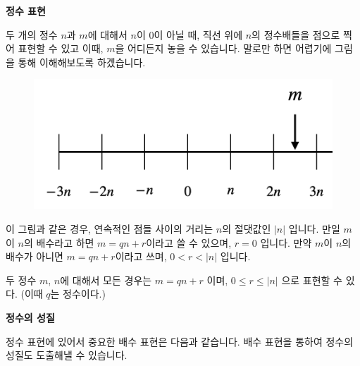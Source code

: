 \bigskip
\begin{flushleft}
    {\textcolor{subheader}{{\LARGE\textbf{정수 표현}}}}
\end{flushleft}

\begin{flushleft}
    두 개의 정수 $n$과 $m$에 대해서 $n$이 $0$이 아닐 때, 직선 위에 $n$의 정수배들을 점으로 찍어 표현할 수 있고 이때, $m$을 어디든지 놓을 수 있습니다. 말로만 하면 어렵기에 그림을 통해 이해해보도록 하겠습니다.
\end{flushleft}
\begin{figure} [h]
\centering
\includegraphics[width=0.7 \textwidth]{Int.png}
\end{figure}
\begin{flushleft}
    이 그림과 같은 경우, 연속적인 점들 사이의 거리는 $n$의 절댓값인 $\lvert n \rvert$ 입니다. 만일 $m$이 $n$의 배수라고 하면 $m = qn + r$이라고 쓸 수 있으며, $r = 0$ 입니다. 만약 $m$이 $n$의 배수가 아니면 $m = qn + r$이라고 쓰며, $0 < r< \lvert n \rvert$ 입니다. 
\end{flushleft}

\begin{tcolorbox}[colback = white, colframe = Definition, title = \textmd{정의: 정수 표현 방법}]
    두 정수 $m$, $n$에 대해서 모든 경우는 $m = qn + r$ 이며, $0 \leq r \leq \lvert n \rvert$ 으로 표현할 수 있다. (이때 $q$는 정수이다.)
\end{tcolorbox}

\bigskip
\begin{flushleft}
    {\textcolor{subheader}{{\LARGE\textbf{정수의 성질}}}}
\end{flushleft}

\begin{flushleft}
    정수 표현에 있어서 중요한 배수 표현은 다음과 같습니다. 배수 표현을 통하여 정수의 성질도 도출해낼 수 있습니다. 
\end{flushleft}

